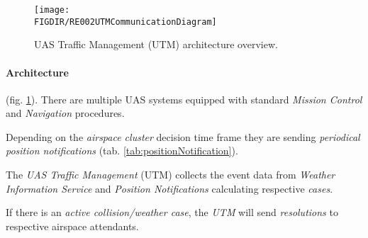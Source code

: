 \begin{figure}[H]
    \centering
    \texttt{[image: \\FIGDIR/RE002UTMCommunicationDiagram]} 
    \caption{UAS Traffic Management (UTM) architecture overview.}
    \label{fig:UTMArchitectureOverview}
\end{figure}

\paragraph{Architecture} (fig. \ref{fig:UTMArchitectureOverview}).  There are multiple UAS systems equipped with standard \emph{Mission Control} and \emph{Navigation} procedures. 

Depending on the \emph{airspace cluster} decision time frame they are sending \emph{periodical position notifications} (tab. \ref{tab:positionNotification}).

The \emph{UAS Traffic Management} (UTM) collects the event data from \emph{Weather Information Service} and \emph{Position Notifications} calculating respective \emph{cases}. 

If there is an \emph{active collision/weather case}, the \emph{UTM} will send \emph{resolutions} to respective airspace attendants. 